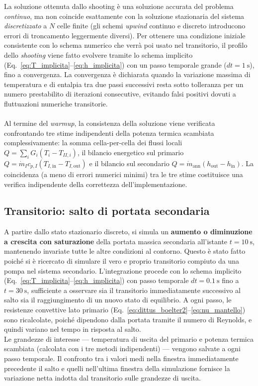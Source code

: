 \documentclass[12pt]{report}
\begin{document}
La soluzione ottenuta dallo shooting è una soluzione accurata del problema \emph{continuo}, ma non coincide esattamente con la soluzione stazionaria del sistema \emph{discretizzato} a $N$ celle finite (gli schemi \textit{upwind} continuo e discreto introducono errori di troncamento leggermente diversi). Per ottenere una condizione iniziale consistente con lo schema numerico che verrà poi usato nel transitorio, il profilo dello \textit{shooting} viene fatto evolvere tramite lo schema implicito (Eq.~\ref{eq:T_implicita}--\ref{eq:h_implicita}) con un passo temporale grande ($dt=\SI{1}{\second}$), fino a convergenza. La convergenza è dichiarata quando la variazione massima di temperatura e di entalpia tra due passi successivi resta sotto tolleranza per un numero prestabilito di iterazioni consecutive, evitando falsi positivi dovuti a fluttuazioni numeriche transitorie.\\\\
Al termine del \textit{warmup}, la consistenza della soluzione viene verificata confrontando tre stime indipendenti della potenza termica scambiata complessivamente: la somma cella-per-cella dei flussi locali $Q=\sum_i G_i(T_i-T_{II,i})$, il bilancio energetico sul primario $Q = \dot m_I c_{p,I}(T_{I,\text{in}}-T_{I,\text{out}})$ e il bilancio sul secondario $Q = \dot m_{\text{ann}}(h_{\text{out}}-h_{\text{in}})$. La coincidenza (a meno di errori numerici minimi) tra le tre stime costituisce una verifica indipendente della correttezza dell'implementazione.

\subsection{Transitorio: salto di portata secondaria}

A partire dallo stato stazionario discreto, si simula un \textbf{aumento o diminuzione a crescita con saturazione} della portata massica secondaria all'istante $t=\SI{10}{\second}$, mantenendo invariate tutte le altre condizioni al contorno. Questo è stato fatto poiché si è ricercato di simulare il vero e proprio transitorio compiuto da una pompa nel sistema secondario. L'integrazione procede con lo schema implicito (Eq.~\ref{eq:T_implicita}--\ref{eq:h_implicita}) con passo temporale $dt=\SI{0.1}{\second}$ fino a $t=\SI{30}{\second}$, sufficiente a osservare sia il transitorio immediatamente successivo al salto sia il raggiungimento di un nuovo stato di equilibrio. A ogni passo, le resistenze convettive lato primario (Eq.~\ref{eq:dittus_boelter2}--\ref{eq:nu_mantello}) sono ricalcolate, poiché dipendono dalla portata tramite il numero di Reynolds, e quindi variano nel tempo in risposta al salto.\\
Le grandezze di interesse — temperatura di uscita del primario e potenza termica scambiata (calcolata con i tre metodi indipendenti) — vengono salvate a ogni passo temporale. Il confronto tra i valori medi nella finestra immediatamente precedente il salto e quelli nell'ultima finestra della simulazione fornisce la variazione netta indotta dal transitorio sulle grandezze di uscita.
\end{document}
